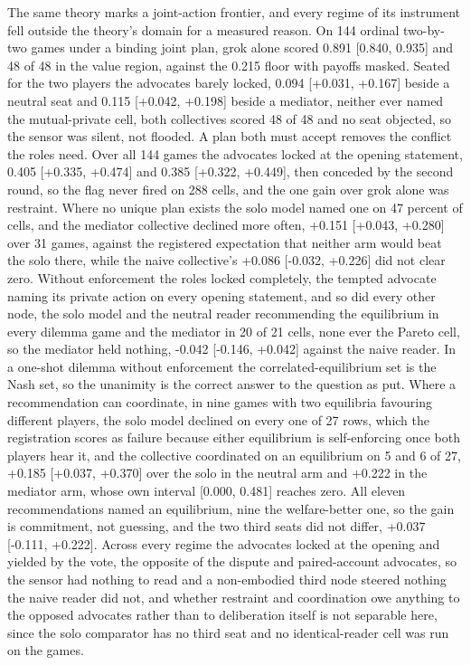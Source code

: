 The same theory marks a joint-action frontier, and every regime of its
instrument fell outside the theory's domain for a measured reason. On 144
ordinal two-by-two games under a binding joint plan, grok alone scored
0.891 [0.840, 0.935] and 48 of 48 in the value region, against the 0.215
floor with payoffs masked.
Seated for the two players the advocates barely locked, 0.094
[+0.031, +0.167] beside a neutral seat and 0.115 [+0.042, +0.198] beside a
mediator, neither ever named the mutual-private cell, both collectives
scored 48 of 48 and no seat objected, so the sensor was silent, not
flooded.
A plan both must accept removes the conflict the roles need. Over all
144 games the advocates locked at the opening statement, 0.405
[+0.335, +0.474] and 0.385 [+0.322, +0.449], then conceded by the second
round, so the flag never fired on 288 cells, and the one gain over grok
alone was restraint. Where no unique
plan exists the solo model named one on 47 percent of cells, and the
mediator collective declined more often, +0.151 [+0.043, +0.280] over 31
games, against the registered expectation that neither arm would beat the
solo there, while the naive collective's +0.086 [-0.032, +0.226] did not
clear zero.
Without enforcement the roles locked completely, the tempted advocate
naming its private action on every opening statement, and so did every
other node, the solo model and the neutral reader recommending the
equilibrium in every dilemma game and the mediator in 20 of 21 cells,
none ever the Pareto cell, so the mediator held nothing, -0.042
[-0.146, +0.042] against the naive reader. In a one-shot dilemma without
enforcement the correlated-equilibrium set is the Nash set, so the
unanimity is the correct answer to the question as put.
Where a recommendation can coordinate, in nine games with two equilibria
favouring different players, the solo model declined on every one of 27
rows, which the registration scores as failure because either
equilibrium is self-enforcing once both players hear it, and the
collective coordinated on an equilibrium on 5 and 6 of 27, +0.185
[+0.037, +0.370] over the solo in the neutral arm and +0.222 in the
mediator arm, whose own interval [0.000, 0.481] reaches zero. All eleven
recommendations named an equilibrium, nine the welfare-better one, so
the gain is commitment, not guessing, and the two third seats did not
differ, +0.037 [-0.111, +0.222]. Across every regime the advocates locked
at the opening and yielded by the vote, the opposite of the dispute and
paired-account advocates, so the sensor had nothing to read and a
non-embodied third node steered nothing the naive reader did not, and
whether restraint and coordination owe anything to the opposed advocates
rather than to deliberation itself is not separable here, since the solo
comparator has no third seat and no identical-reader cell was run on the
games.
